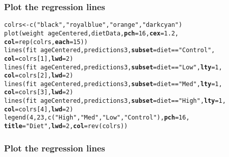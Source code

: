 \documentclass[color=usenames,dvipsnames]{beamer}\usepackage[]{graphicx}\usepackage[]{color}
\makeatletter
\newcommand{\hlnum}[1]{\textcolor[rgb]{0.69,0.494,0}{#1}}%
\newcommand{\hlstr}[1]{\textcolor[rgb]{0.749,0.012,0.012}{#1}}%
\newcommand{\hlopt}[1]{\textcolor[rgb]{0,0,0}{#1}}%
\newcommand{\hlstd}[1]{\textcolor[rgb]{0,0,0}{#1}}%
\newcommand{\hlkwb}[1]{\textcolor[rgb]{0,0.341,0.682}{#1}}%
\newcommand{\hlkwc}[1]{\textcolor[rgb]{0,0,0}{\textbf{#1}}}%
\newcommand{\hlkwd}[1]{\textcolor[rgb]{0.004,0.004,0.506}{#1}}%
\newenvironment{kframe}{%
 \def\at@end@of@kframe{}%
 \ifinner\ifhmode%
  \def\at@end@of@kframe{\end{minipage}}%
  \begin{minipage}{\columnwidth}%
 \fi\fi%
 \def\FrameCommand##1{\hskip\@totalleftmargin \hskip-\fboxsep
 \colorbox{shadecolor}{##1}\hskip-\fboxsep
     \hskip-\linewidth \hskip-\@totalleftmargin \hskip\columnwidth}%
 \MakeFramed {\advance\hsize-\width
   \@totalleftmargin\z@ \linewidth\hsize
   \@setminipage}}%
 {\par\unskip\endMakeFramed%
 \at@end@of@kframe}
\newenvironment{knitrout}{}{} %
\makeatother
\begin{document}
\begin{frame}[fragile]
  \frametitle{Plot the regression lines}
\footnotesize %

\begin{knitrout}\footnotesize
{}\color{fgcolor}\begin{kframe}
\begin{alltt}
\hlstd{colrs} \hlkwb{<-} \hlkwd{c}\hlstd{(}\hlstr{"black"}\hlstd{,} \hlstr{"royalblue"}\hlstd{,} \hlstr{"orange"}\hlstd{,} \hlstr{"darkcyan"}\hlstd{)}
\hlkwd{plot}\hlstd{(weight} \hlopt{~} \hlstd{ageCentered, dietData,} \hlkwc{pch}\hlstd{=}\hlnum{16}\hlstd{,} \hlkwc{cex}\hlstd{=}\hlnum{1.2}\hlstd{,}
     \hlkwc{col}\hlstd{=}\hlkwd{rep}\hlstd{(colrs,} \hlkwc{each}\hlstd{=}\hlnum{15}\hlstd{))}
\hlkwd{lines}\hlstd{(fit} \hlopt{~} \hlstd{ageCentered, predictions3,} \hlkwc{subset}\hlstd{=diet}\hlopt{==}\hlstr{"Control"}\hlstd{,}
      \hlkwc{col}\hlstd{=colrs[}\hlnum{1}\hlstd{],} \hlkwc{lwd}\hlstd{=}\hlnum{2}\hlstd{)}
\hlkwd{lines}\hlstd{(fit} \hlopt{~} \hlstd{ageCentered, predictions3,} \hlkwc{subset}\hlstd{=diet}\hlopt{==}\hlstr{"Low"}\hlstd{,} \hlkwc{lty}\hlstd{=}\hlnum{1}\hlstd{,}
      \hlkwc{col}\hlstd{=colrs[}\hlnum{2}\hlstd{],} \hlkwc{lwd}\hlstd{=}\hlnum{2}\hlstd{)}
\hlkwd{lines}\hlstd{(fit} \hlopt{~} \hlstd{ageCentered, predictions3,} \hlkwc{subset}\hlstd{=diet}\hlopt{==}\hlstr{"Med"}\hlstd{,} \hlkwc{lty}\hlstd{=}\hlnum{1}\hlstd{,}
      \hlkwc{col}\hlstd{=colrs[}\hlnum{3}\hlstd{],} \hlkwc{lwd}\hlstd{=}\hlnum{2}\hlstd{)}
\hlkwd{lines}\hlstd{(fit} \hlopt{~} \hlstd{ageCentered, predictions3,} \hlkwc{subset}\hlstd{=diet}\hlopt{==}\hlstr{"High"}\hlstd{,} \hlkwc{lty}\hlstd{=}\hlnum{1}\hlstd{,}
      \hlkwc{col}\hlstd{=colrs[}\hlnum{4}\hlstd{],} \hlkwc{lwd}\hlstd{=}\hlnum{2}\hlstd{)}
\hlkwd{legend}\hlstd{(}\hlnum{4}\hlstd{,} \hlnum{23}\hlstd{,} \hlkwd{c}\hlstd{(}\hlstr{"High"}\hlstd{,} \hlstr{"Med"}\hlstd{,} \hlstr{"Low"}\hlstd{,} \hlstr{"Control"}\hlstd{),} \hlkwc{pch}\hlstd{=}\hlnum{16}\hlstd{,}
       \hlkwc{title}\hlstd{=}\hlstr{"Diet"}\hlstd{,} \hlkwc{lwd}\hlstd{=}\hlnum{2}\hlstd{,} \hlkwc{col}\hlstd{=}\hlkwd{rev}\hlstd{(colrs))}
\end{alltt}
\end{kframe}
\end{knitrout}
\end{frame}






\begin{frame}
  \frametitle{Plot the regression lines}
  \vspace{-0.5cm}
  \begin{center}
  \end{center}
\end{frame}
\end{document}
